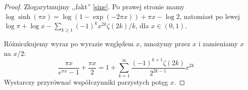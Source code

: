 \begin{proof}
	Zlogarytmujmy ,,fakt'' \ref{sine}.
	Po prawej stronie mamy $\log \sinh (\pi x) = \log(1 - \exp(-2 \pi x)) + \pi x - \log 2$, natomiast po lewej $\log \pi + \log x - \sum_{k \ge 1} (-1)^{k} x^{2k} \zeta(2k) / k$, dla $x \in (0,1)$.

	Różniczkujemy wyraz po wyrazie względem $x$, mnożymy przez $x$ i zamieniamy $x$ na $x/2$:
	\[\frac{\pi x}{e^{\pi x}- 1} + \frac{\pi x}{2} =  1 + \sum_{k=1}^\infty \frac{(-1)^{k+1} \zeta(2k)}{2^{2k-1}} x^{2k}\]
	Wystarczy przyrównać współczynniki parzystych potęg $x$.
\end{proof}